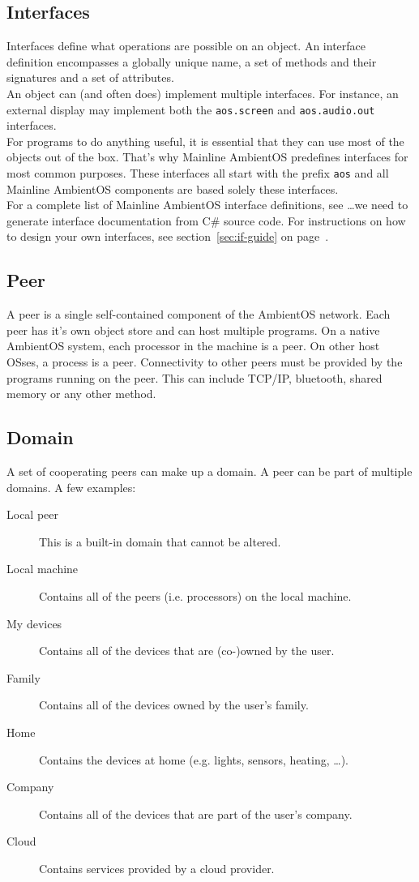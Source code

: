 \documentclass[a4paper]{article}
\begin{document}
\subsection{Interfaces}
Interfaces define what operations are possible on an object. An interface definition encompasses a globally unique name, a set of methods and their signatures and a set of attributes. \\
An object can (and often does) implement multiple interfaces. For instance, an external display may implement both the {\tt aos.screen} and {\tt aos.audio.out} interfaces. \\
For programs to do anything useful, it is essential that they can use most of the objects out of the box. That's why Mainline AmbientOS predefines interfaces for most common purposes. These interfaces all start with the prefix {\tt aos} and all Mainline AmbientOS components are based solely these interfaces. \\
For a complete list of Mainline AmbientOS interface definitions, see {\q \ldots we need to generate interface documentation from C\# source code}. For instructions on how to design your own interfaces, see section~\ref{sec:if-guide} on page~\pageref{sec:if-guide}.

\subsection{Peer}
A peer is a single self-contained component of the AmbientOS network. Each peer has it's own object store and can host multiple programs. On a native AmbientOS system, each processor in the machine is a peer. On other host OSses, a process is a peer. Connectivity to other peers must be provided by the programs running on the peer. This can include TCP/IP, bluetooth, shared memory or any other method.

\subsection{Domain}
A set of cooperating peers can make up a domain. A peer can be part of multiple domains. A few examples:

\begin{description}
  \item[Local peer] This is a built-in domain that cannot be altered.
  \item[Local machine] Contains all of the peers (i.e. processors) on the local machine.
  \item[My devices] Contains all of the devices that are (co-)owned by the user.
  \item[Family] Contains all of the devices owned by the user's family.
  \item[Home] Contains the devices at home (e.g. lights, sensors, heating, \ldots).
  \item[Company] Contains all of the devices that are part of the user's company.
  \item[Cloud] Contains services provided by a cloud provider.
\end{description}
\end{document}
